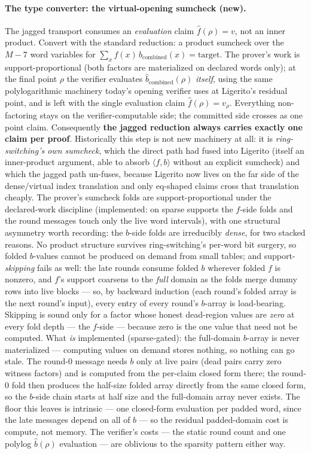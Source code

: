 \documentclass[11pt]{article}
\theoremstyle{definition}
\begin{document}
\paragraph{The type converter: the virtual-opening sumcheck (new).} The
jagged transport consumes an \emph{evaluation} claim
$\hat f(\rho) = v$, not an inner product. Convert with the standard
reduction: a product sumcheck over the $M-7$ word variables for
$\sum_x f(x)\, b_{\mathrm{combined}}(x) = \mathrm{target}$. The prover's
work is support-proportional (both factors are materialized on declared
words only); at the final point $\rho$ the verifier evaluates
$\hat b_{\mathrm{combined}}(\rho)$ \emph{itself}, using the same
polylogarithmic machinery today's opening verifier uses at Ligerito's
residual point, and is left with the single evaluation claim
$\hat f(\rho) = v_\rho$. Everything non-factoring stays on the
verifier-computable side; the committed side crosses as one point claim.
Consequently \textbf{the jagged reduction always carries exactly one
claim per proof}. Historically this step is not new machinery at all: it
is \emph{ring-switching's own sumcheck}, which the direct path had fused
into Ligerito (itself an inner-product argument, able to absorb
$\langle f, b\rangle$ without an explicit sumcheck) and which the jagged
path un-fuses, because Ligerito now lives on the far side of the
dense/virtual index translation and only eq-shaped claims cross that
translation cheaply. The prover's sumcheck folds are support-proportional
under the declared-work discipline (implemented: on sparse supports the
$f$-side folds and the round messages touch only the live word
intervals), with one structural asymmetry worth recording: the $b$-side
folds are irreducibly \emph{dense}, for two stacked reasons. No product
structure survives ring-switching's per-word bit surgery, so folded
$b$-values cannot be produced on demand from small tables; and
support-\emph{skipping} fails as well: the late rounds consume folded
$b$ wherever folded $f$ is nonzero, and $f$'s support coarsens to the
\emph{full} domain as the folds merge dummy rows into live blocks ---
so, by backward induction (each round's folded array is the next
round's input), every entry of every round's $b$-array is load-bearing.
Skipping is sound only for a factor whose honest dead-region values are
\emph{zero} at every fold depth --- the $f$-side --- because zero is
the one value that need not be computed. What \emph{is} implemented
(sparse-gated): the full-domain $b$-array is never materialized ---
computing values on demand stores nothing, so nothing can go stale.
The round-0 message needs $b$ only at live pairs (dead pairs carry zero
witness factors) and is computed from the per-claim closed form there;
the round-0 fold then produces the half-size folded array directly from
the same closed form, so the $b$-side chain starts at half size and the
full-domain array never exists. The floor this leaves is intrinsic ---
one closed-form evaluation per padded word, since the late messages
depend on all of $b$ --- so the residual padded-domain cost is
compute, not memory. The verifier's costs --- the
static round count and one polylog $\hat b(\rho)$ evaluation --- are
oblivious to the sparsity pattern either way.
\end{document}
